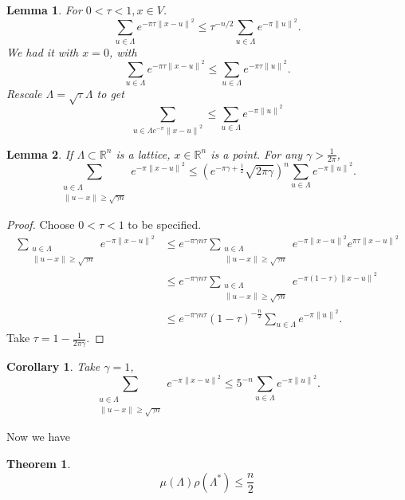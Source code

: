 \documentclass{report}
\newcommand{\R}{\mathbb{R}}
\newcommand{\norm}[1]{\left\| #1 \right\|}
\newtheorem{theorem}{Theorem}[section]
\newtheorem{corollary}{Corollary}[section]
\newtheorem{lemma}{Lemma}[section]
\theoremstyle{definition}
\theoremstyle{remark}
\numberwithin{equation}{section}
\begin{document}
\begin{lemma}
    For $0 < \tau < 1, x \in V$. \[\sum_{u \in \Lambda} e^{-\pi\tau\norm{x - u}^2} \leq \tau^{-n/2}\sum_{u\in\Lambda} e^{-\pi\norm{u}^2}.\]
    We had it with $x = 0$, with \[
        \sum_{u \in \Lambda} e^{-\pi\tau\norm{x - u}^2} \leq \sum_{u\in\Lambda} e^{-\pi\tau\norm{u}^2}.
    \]
    Rescale $\Lambda = \sqrt{\tau}\Lambda$ to get \[
        \sum_{u \in \Lambda e^{-\pi}\norm{x - u}^2} \leq \sum_{u \in \Lambda} e^{-\pi\norm{u}^2}    
    \]
\end{lemma}
\begin{lemma}
    If $\Lambda \subset \R^n$ is a lattice, $x \in \R^n$ is a point. For any $\gamma > \frac{1}{2\pi}$, \[\sum_{\substack{u \in \Lambda\\ \norm{u - x} \geq \sqrt{\gamma n}}} e^{-\pi\norm{x - u}^2} \leq \left(e^{-\pi\gamma+\frac{1}{2}}\sqrt{2\pi\gamma}\right)^n \sum_{u \in \Lambda}e^{-\pi\norm{u}^2}.\]
\end{lemma}
\begin{proof}
    Choose $0 < \tau < 1$ to be specified.
    \begin{align*}
        \sum_{\substack{u \in \Lambda\\ \norm{u - x} \geq \sqrt{\gamma n}}} e^{-\pi\norm{x - u}^2} & \leq e^{-\pi\gamma n \tau} \sum_{\substack{u \in \Lambda\\ \norm{u - x} \geq \sqrt{\gamma n}}} e^{-\pi\norm{x-u}^2} e^{\pi\tau\norm{x - u}^2} \\
        & \leq e^{-\pi\gamma n \tau} \sum_{\substack{u \in \Lambda\\ \norm{u - x} \geq \sqrt{\gamma n}}} e^{-\pi(1-\tau)\norm{x-u}^2} \\
        & \leq e^{-\pi\gamma n \tau} (1-\tau)^{-\frac{n}{2}} \sum_{u\in\Lambda} e^{-\pi\norm{u}^2}.
    \end{align*}
    Take $\tau = 1 - \frac{1}{2\pi\gamma}$.
\end{proof}
\begin{corollary}
    Take $\gamma = 1$, \[
        \sum_{\substack{u \in \Lambda\\ \norm{u - x} \geq \sqrt{\gamma n}}} e^{-\pi\norm{x - u}^2} \leq 5^{-n} \sum_{u \in \Lambda} e^{-\pi\norm{u}^2}.
    \]
\end{corollary}
Now we have \begin{theorem}
    \[\mu(\Lambda)\rho(\Lambda^*) \leq \frac{n}{2}\]
\end{theorem}
\end{document}
